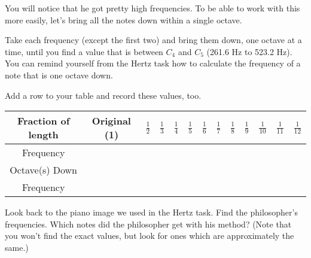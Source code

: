 \documentclass[12pt,noauthor,nooutcomes,hints,instructornotes]{ximera}%
\begin{document}
\begin{question} You will notice that he got pretty high frequencies. To be able to work with this more easily, let's bring all the notes down within a single octave.

Take each frequency (except the first two) and bring them down, one octave at a time, until you find a value that is between $C_4$ and $C_5$ (261.6 Hz to 523.2 Hz). You can remind yourself from the Hertz task how to calculate the frequency of a note that is one octave down.

Add a row to your table and record these values, too.

\begin{center}
\renewcommand{\arraystretch}{3}
\begin{tabular}{|c|c|c|c|c|c|c|c|c|c|c|c|c|}\hline
\footnotesize{Fraction of length} & \footnotesize{Original (1)} & \hspace{0.02in} $\frac{1}{2}$ \hspace{0.02in} & \hspace{0.02in} $\frac{1}{3}$ \hspace{0.02in} & \hspace{0.02in} $\frac{1}{4}$ \hspace{0.02in} & \hspace{0.02in} $\frac{1}{5}$ \hspace{0.02in} & \hspace{0.02in} $\frac{1}{6}$ \hspace{0.02in} & \hspace{0.02in} $\frac{1}{7}$ \hspace{0.02in} & \hspace{0.02in} $\frac{1}{8}$ \hspace{0.02in} & \hspace{0.02in} $\frac{1}{9}$ \hspace{0.02in} & \hspace{0.02in} $\frac{1}{10}$ \hspace{0.02in} & \hspace{0.02in} $\frac{1}{11}$ \hspace{0.02in} & \hspace{0.02in} $\frac{1}{12}$ \hspace{0.02in}    \\\hline
Frequency & &&&&&&&&&&& \\\hline
\footnotesize{Octave(s) Down} & &&&&&&&&&&&\\
\footnotesize{Frequency} & &&&&&&&&&&& \\\hline
\end{tabular}
\end{center}
\end{question}
\begin{question} Look back to the piano image we used in the Hertz task. Find the philosopher's frequencies. Which notes did the philosopher get with his method? (Note that you won't find the exact values, but look for ones which are approximately the same.)
\end{question}
\end{document}
